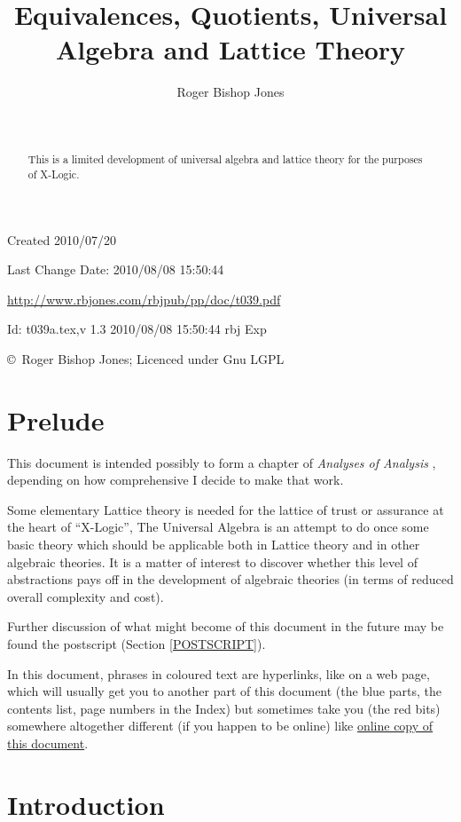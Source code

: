 \documentclass[11pt]{article}
\title{Equivalences, Quotients, Universal Algebra and Lattice Theory}
\author{Roger Bishop Jones}
\date{\ }
\begin{document}
\begin{titlepage}
\maketitle
\begin{abstract}
This is a limited development of universal algebra and lattice theory for the purposes of X-Logic.
\end{abstract}
\vfill

\begin{centering}
{\footnotesize

Created 2010/07/20

Last Change $ $Date: 2010/08/08 15:50:44 $ $

\href{http://www.rbjones.com/rbjpub/pp/doc/t039.pdf}
{http://www.rbjones.com/rbjpub/pp/doc/t039.pdf}

$ $Id: t039a.tex,v 1.3 2010/08/08 15:50:44 rbj Exp $ $

\copyright\ Roger Bishop Jones; Licenced under Gnu LGPL

}%
\end{centering}

\thispagestyle{empty}
\end{titlepage}

\newpage
\addtocounter{page}{1}
{\parskip=0pt\tableofcontents}

\section{Prelude}

This document is intended possibly to form a chapter of {\it Analyses of Analysis} \cite{rbjb001}, depending on how comprehensive I decide to make that work.

Some elementary Lattice theory is needed for the lattice of trust or assurance at the heart of ``X-Logic'',
The Universal Algebra is an attempt to do once some basic theory which should be applicable both in Lattice theory and in other algebraic theories.
It is a matter of interest to discover whether this level of abstractions pays off in the development of algebraic theories (in terms of reduced overall complexity and cost).

Further discussion of what might become of this document in the future may be found the postscript (Section \ref{POSTSCRIPT}).

In this document, phrases in coloured text are hyperlinks, like on a web page, which will usually get you to another part of this document (the blue parts, the contents list, page numbers in the Index) but sometimes take you (the red bits) somewhere altogether different (if you happen to be online) like \href{http://rbjones.com/rbjpub/pp/doc/t039.pdf}{online copy of this document}.

\section{Introduction}
\end{document}

